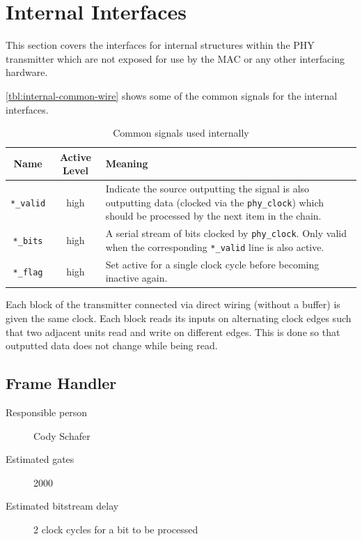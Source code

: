 \documentclass[dvips,10pt,twocolumn]{article}
\newcommand{\wire}{\texttt}
\begin{document}
\section{Internal Interfaces}
This section covers the interfaces for internal structures within the PHY
transmitter which are not exposed for use by the MAC or any other interfacing
hardware.

\autoref{tbl:internal-common-wire} shows some of the common signals for
the internal interfaces.

\begin{table}
\begin{tabulary}{\linewidth}{c|C|L}
	\label{tbl:internal-common-wire}
	Name & Active Level & Meaning \\ \hline
	
	\wire{*\_valid} & high & Indicate the source outputting the signal
	is also outputting data (clocked via the \wire{phy\_clock}) which
	should be processed by the next item in the chain. \\

	\wire{*\_bits} & high & A serial stream of bits clocked by
	\wire{phy\_clock}. Only valid when the corresponding
	\wire{*\_valid} line is also active. \\

	\wire{*\_flag} & high & Set active for a single clock cycle
	before becoming inactive again.
\end{tabulary}
\caption{Common signals used internally}
\end{table}

Each block of the transmitter connected via direct wiring (without a
buffer) is given the same clock. Each block reads its inputs on alternating
clock edges such that two adjacent units read and write on different edges.
This is done so that outputted data does not change while being read.


\subsection{Frame Handler}
\begin{description}
	\item[Responsible person] Cody Schafer
	\item[Estimated gates] 2000
	\item[Estimated bitstream delay] 2 clock cycles for a bit to be
		processed 
\end{description}
\end{document}
